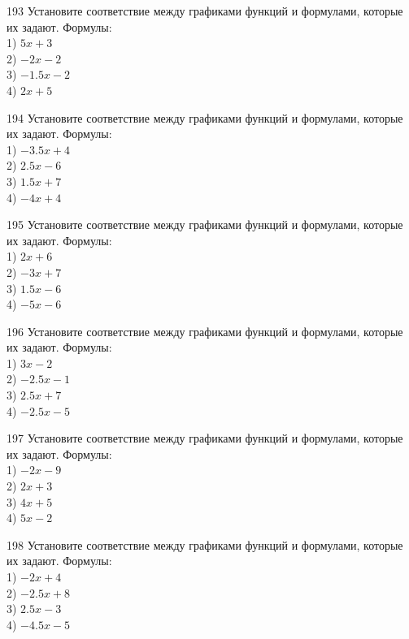 \documentclass[4apaper]{article}
\begin{document}
\begin{taskBN}{193}
Установите соответствие между графиками функций и формулами, которые их задают. Формулы: \\1) $5x+3$\\2) $-2x-2$\\3) $-1.5x-2$\\4) $2x+5$
\end{taskBN}

\begin{taskBN}{194}
Установите соответствие между графиками функций и формулами, которые их задают. Формулы: \\1) $-3.5x+4$\\2) $2.5x-6$\\3) $1.5x+7$\\4) $-4x+4$
\end{taskBN}

\begin{taskBN}{195}
Установите соответствие между графиками функций и формулами, которые их задают. Формулы: \\1) $2x+6$\\2) $-3x+7$\\3) $1.5x-6$\\4) $-5x-6$
\end{taskBN}

\begin{taskBN}{196}
Установите соответствие между графиками функций и формулами, которые их задают. Формулы: \\1) $3x-2$\\2) $-2.5x-1$\\3) $2.5x+7$\\4) $-2.5x-5$
\end{taskBN}

\begin{taskBN}{197}
Установите соответствие между графиками функций и формулами, которые их задают. Формулы: \\1) $-2x-9$\\2) $2x+3$\\3) $4x+5$\\4) $5x-2$
\end{taskBN}

\begin{taskBN}{198}
Установите соответствие между графиками функций и формулами, которые их задают. Формулы: \\1) $-2x+4$\\2) $-2.5x+8$\\3) $2.5x-3$\\4) $-4.5x-5$
\end{taskBN}
\end{document}
